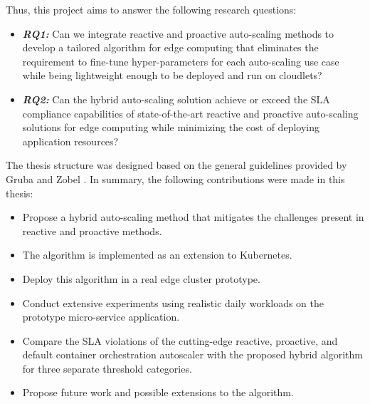 Thus, this project aims to answer the following research questions:

\begin{itemize}
    \item \textbf{\textit{RQ1:}} Can we integrate reactive and proactive auto-scaling methods to develop a tailored algorithm for edge computing that eliminates the requirement to fine-tune hyper-parameters for each auto-scaling use case while being lightweight enough to be deployed and run on cloudlets?
    \item \textbf{\textit{RQ2:}} Can the hybrid auto-scaling solution achieve or exceed the SLA compliance capabilities of state-of-the-art reactive and proactive auto-scaling solutions for edge computing while minimizing the cost of deploying application resources?
\end{itemize}

The thesis structure was designed based on the general guidelines provided by Gruba and Zobel \cite{gruba2017write}. In summary, the following contributions were made in this thesis:

\begin{itemize}
    \item Propose a hybrid auto-scaling method that mitigates the challenges present in reactive and proactive methods.
    \item The algorithm is implemented as an extension to Kubernetes.
    \item Deploy this algorithm in a real edge cluster prototype.
    \item Conduct extensive experiments using realistic daily workloads on the prototype micro-service application.
    \item Compare the SLA violations of the cutting-edge reactive, proactive, and default container orchestration autoscaler with the proposed hybrid algorithm for three separate threshold categories.
    \item Propose future work and possible extensions to the algorithm.
\end{itemize}
